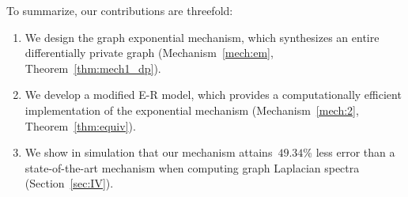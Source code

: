 \documentclass[conference]{ieeeconf}
\newcommand{\ER}{Erd\H{o}s-R\'{e}nyi }
\begin{document}


To summarize, our contributions are threefold: 
\begin{enumerate}
    \item We design the graph exponential mechanism, which synthesizes an entire differentially private graph (Mechanism~\ref{mech:em}, Theorem~\ref{thm:mech1_dp}).
    \item We develop a modified E-R model, which provides a computationally efficient implementation of the exponential mechanism (Mechanism~\ref{mech:2}, Theorem~\ref{thm:equiv}).
    \item We show in simulation that our mechanism attains~$49.34$\% less error than a state-of-the-art mechanism when computing graph Laplacian spectra (Section~\ref{sec:IV}). 
\end{enumerate}

\end{document}
